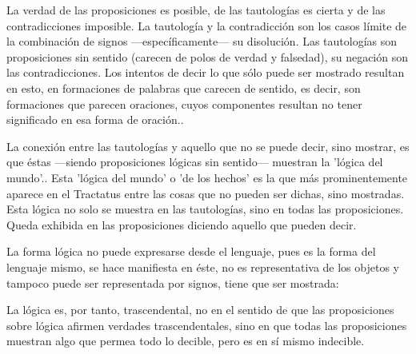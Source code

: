 
    La verdad de las proposiciones es posible, de las tautologías es cierta y de las
    contradicciones imposible. La tautología y la contradicción son los casos límite
    de la combinación de signos ---específicamente--- su
    disolución.\autocite[cf.~][4.464 y 4.466]{tractatus} Las tautologías son
    proposiciones sin sentido (carecen de polos de verdad y falsedad), su negación son
    las contradicciones. Los intentos de decir lo que sólo puede ser mostrado
    resultan en esto, en formaciones de palabras que carecen de sentido, es decir,
    son formaciones que parecen oraciones, cuyos componentes resultan no tener
    significado en esa forma de oración.\autocite[cf.~][p.~163~\S2]{IWT}.

La conexión entre las tautologías y aquello que no se puede decir, sino
mostrar, es que éstas ---siendo proposiciones lógicas sin sentido--- muestran
la 'lógica del mundo'.\autocite[cf.~][p.~163~\S3]{IWT}. Esta 'lógica del
mundo' o 'de los hechos' es la que más prominentemente aparece en el Tractatus
entre las cosas que no pueden ser dichas, sino mostradas. Esta lógica no solo
se muestra en las tautologías, sino en todas las proposiciones. Queda exhibida
en las proposiciones diciendo aquello que pueden decir.

La forma lógica no puede expresarse desde el lenguaje, pues es la forma del
lenguaje mismo, se hace manifiesta en éste, no es representativa de los objetos
y tampoco puede ser representada por signos, tiene que ser mostrada:

La lógica es, por tanto, trascendental, no en el sentido de que las
proposiciones sobre lógica afirmen verdades trascendentales, sino en que todas
las proposiciones muestran algo que permea todo lo decible, pero es en sí mismo
indecible.\autocite[cf.~][p.~166 \S2]{IWT}

